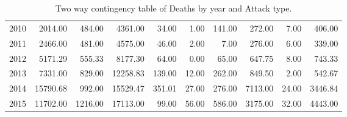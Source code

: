 \begin{table}
{\begin{tabular}{rrrrrrrrrr}
  2010 & 2014.00 & 484.00 & 4361.00 & 34.00 & 1.00 & 141.00 & 272.00 & 7.00 & 406.00 \\ 
  2011 & 2466.00 & 481.00 & 4575.00 & 46.00 & 2.00 & 7.00 & 276.00 & 6.00 & 339.00 \\ 
  2012 & 5171.29 & 555.33 & 8177.30 & 64.00 & 0.00 & 65.00 & 647.75 & 8.00 & 743.33 \\ 
  2013 & 7331.00 & 829.00 & 12258.83 & 139.00 & 12.00 & 262.00 & 849.50 & 2.00 & 542.67 \\ 
  2014 & 15790.68 & 992.00 & 15529.47 & 351.01 & 27.00 & 276.00 & 7113.00 & 24.00 & 3446.84 \\ 
  2015 & 11702.00 & 1216.00 & 17113.00 & 99.00 & 56.00 & 586.00 & 3175.00 & 32.00 & 4443.00 \\ 
   \hline
\end{tabular}}
\caption{Two way contingency table of Deaths by year and Attack type.}
\label{tab:attacksyear}
\end{table}

